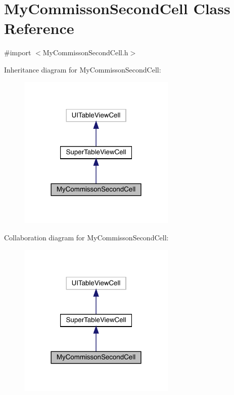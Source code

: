 \hypertarget{interface_my_commisson_second_cell}{}\section{My\+Commisson\+Second\+Cell Class Reference}
\label{interface_my_commisson_second_cell}


{\ttfamily \#import $<$My\+Commisson\+Second\+Cell.\+h$>$}



Inheritance diagram for My\+Commisson\+Second\+Cell\+:\nopagebreak
\begin{figure}[H]
\begin{center}
\leavevmode
\includegraphics[width=213pt]{interface_my_commisson_second_cell__inherit__graph}
\end{center}
\end{figure}


Collaboration diagram for My\+Commisson\+Second\+Cell\+:\nopagebreak
\begin{figure}[H]
\begin{center}
\leavevmode
\includegraphics[width=213pt]{interface_my_commisson_second_cell__coll__graph}
\end{center}
\end{figure}
